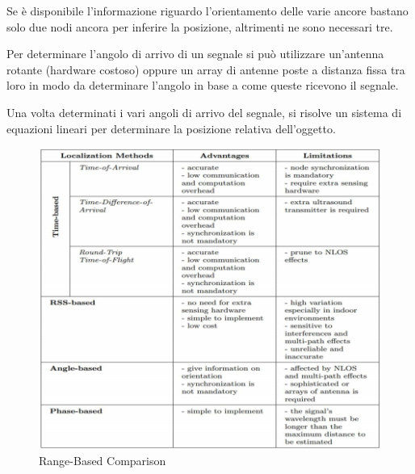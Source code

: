 \begin{itemize}
    Se è disponibile l'informazione riguardo l'orientamento delle varie ancore bastano solo due nodi ancora per inferire la posizione, altrimenti ne sono necessari tre.

    Per determinare l’angolo di arrivo di un segnale si può utilizzare un'antenna rotante (hardware costoso) oppure un array di antenne poste a distanza fissa tra loro in modo da determinare l'angolo in base a come queste ricevono il segnale.

    Una volta determinati i vari angoli di arrivo del segnale, si risolve un sistema di equazioni lineari per determinare la posizione relativa dell'oggetto.
\end{itemize}

\begin{figure}
        \centering
        \includegraphics[scale=0.9]{fig4-lec3pt1.png}
        \caption{Range-Based Comparison}
        \label{fig:fig4-lec3pt1}
\end{figure}



